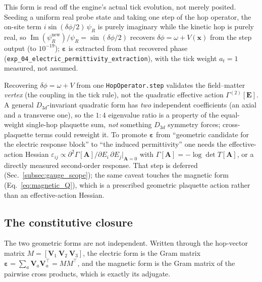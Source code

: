 This form is read off the engine's actual tick evolution, not merely posited.
Seeding a uniform real probe state and taking one step of the hop operator, the
on-site term $i\sin(\delta\phi/2)\,\psi_R$ is purely imaginary while the kinetic hop
is purely real, so $\operatorname{Im}(\psi_R^{\text{new}})/\psi_R = \sin(\delta\phi/2)$
recovers $\delta\phi = \omega + V(\mathbf{x})$ from the step output (to $10^{-19}$);
$\boldsymbol{\varepsilon}$ is extracted from that recovered phase
(\texttt{exp\_04\_electric\_permittivity\_extraction}), with the tick weight
$a_t=1$ measured, not assumed.

\begin{remark}
\label{rem:vertex_not_action}
Recovering $\delta\phi = \omega + V$ from one \texttt{HopOperator.step} validates the
field--matter \emph{vertex} (the coupling in the tick rule), not the quadratic
effective action $\Gamma^{(2)}[\mathbf{E}]$. A general $D_{3d}$-invariant quadratic
form has \emph{two} independent coefficients (an axial and a transverse one), so the
$1{:}4$ eigenvalue ratio is a property of the equal-weight single-hop plaquette sum,
\emph{not} something $D_{3d}$ symmetry forces; cross-plaquette terms could reweight
it. To promote $\boldsymbol{\varepsilon}$ from ``geometric candidate for the electric
response block'' to ``the induced permittivity'' one needs the effective-action
Hessian $\varepsilon_{ij} \propto \partial^2\Gamma[\mathbf{A}]/\partial E_i\,\partial
E_j\big|_{\mathbf{A}=0}$ with $\Gamma[\mathbf{A}] = -\log\det T[\mathbf{A}]$, or a
directly measured second-order response. That step is deferred
(Sec.~\ref{subsec:gauge_scope}); the same caveat touches the magnetic form
(Eq.~\eqref{eq:magnetic_Q}), which is a prescribed geometric plaquette action rather
than an effective-action Hessian.
\end{remark}

\subsection{The constitutive closure}
\label{subsec:constitutive_closure}

The two geometric forms are not independent. Written through the hop-vector matrix
$M = [\mathbf{V}_1\ \mathbf{V}_2\ \mathbf{V}_3]$, the electric form is the Gram
matrix $\boldsymbol{\varepsilon} = \sum_a\mathbf{V}_a\mathbf{V}_a^{\!\top} =
MM^{\!\top}$, and the magnetic form is the Gram matrix of the pairwise cross
products, which is exactly its adjugate.

